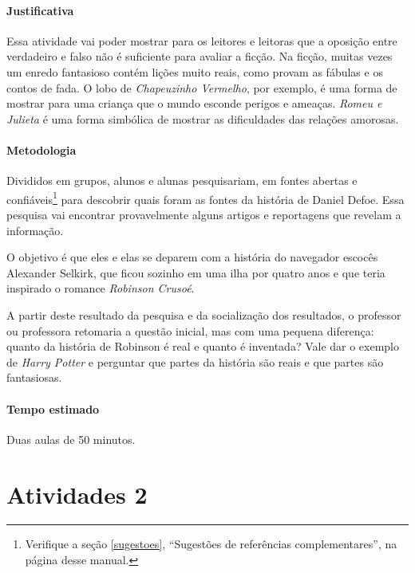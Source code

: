 \documentclass[12pt]{extarticle}
\begin{document}
\paragraph{Justificativa}
Essa atividade vai poder mostrar para os leitores e leitoras que a
oposição entre verdadeiro e falso não é suficiente para avaliar a
ficção. Na ficção, muitas vezes um enredo fantasioso contém lições muito
reais, como provam as fábulas e os contos de fada. O lobo de
\emph{Chapeuzinho Vermelho}, por exemplo, é uma forma de mostrar para uma criança que
o mundo esconde perigos e ameaças. \emph{Romeu e Julieta} é uma forma
simbólica de mostrar as dificuldades das relações amorosas.


\paragraph{Metodologia}
Divididos em grupos, alunos e alunas pesquisariam, 
em fontes abertas e confiáveis\footnote{Verifique 
	a seção \ref{sugestoes}, ``Sugestões de referências complementares'', 
	na página \pageref{sugestoes} desse manual.}
para descobrir quais
foram as fontes da história de Daniel Defoe. Essa pesquisa vai encontrar provavelmente alguns artigos e reportagens
que revelam a informação.

O objetivo é que eles e elas se deparem com a história do navegador
escocês Alexander Selkirk, que ficou sozinho em uma ilha por quatro anos
e que teria inspirado o romance \emph{Robinson Crusoé}.

A partir deste resultado da pesquisa e da socialização dos resultados, o
professor ou professora retomaria a questão inicial, mas com uma pequena
diferença: quanto da história de Robinson é real e quanto é inventada? Vale dar o exemplo de \emph{Harry Potter} e perguntar que partes da
história são reais e que partes são fantasiosas.

\paragraph{Tempo estimado} Duas aulas de 50 minutos.

\pagebreak\section{Atividades 2}
\end{document}
